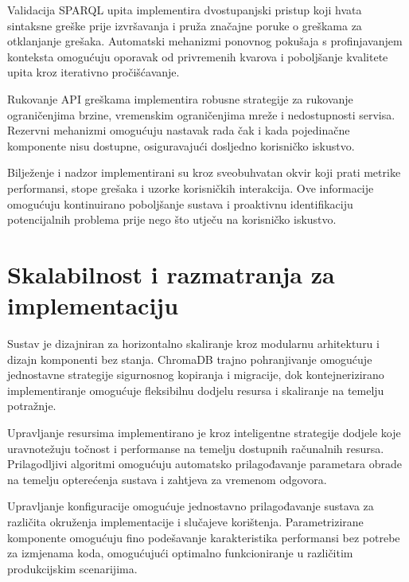 Validacija SPARQL upita implementira dvostupanjski pristup koji hvata sintaksne greške prije izvršavanja i pruža značajne poruke o greškama za otklanjanje grešaka. Automatski mehanizmi ponovnog pokušaja s profinjavanjem konteksta omogućuju oporavak od privremenih kvarova i poboljšanje kvalitete upita kroz iterativno pročišćavanje.

Rukovanje API greškama implementira robusne strategije za rukovanje ograničenjima brzine, vremenskim ograničenjima mreže i nedostupnosti servisa. Rezervni mehanizmi omogućuju nastavak rada čak i kada pojedinačne komponente nisu dostupne, osiguravajući dosljedno korisničko iskustvo.

Bilježenje i nadzor implementirani su kroz sveobuhvatan okvir koji prati metrike performansi, stope grešaka i uzorke korisničkih interakcija. Ove informacije omogućuju kontinuirano poboljšanje sustava i proaktivnu identifikaciju potencijalnih problema prije nego što utječu na korisničko iskustvo.

\section{Skalabilnost i razmatranja za implementaciju}
\label{sec:scalability}

Sustav je dizajniran za horizontalno skaliranje kroz modularnu arhitekturu i dizajn komponenti bez stanja. ChromaDB trajno pohranjivanje omogućuje jednostavne strategije sigurnosnog kopiranja i migracije, dok kontejnerizirano implementiranje omogućuje fleksibilnu dodjelu resursa i skaliranje na temelju potražnje.

Upravljanje resursima implementirano je kroz inteligentne strategije dodjele koje uravnotežuju točnost i performanse na temelju dostupnih računalnih resursa. Prilagodljivi algoritmi omogućuju automatsko prilagođavanje parametara obrade na temelju opterećenja sustava i zahtjeva za vremenom odgovora.

Upravljanje konfiguracije omogućuje jednostavno prilagođavanje sustava za različita okruženja implementacije i slučajeve korištenja. Parametrizirane komponente omogućuju fino podešavanje karakteristika performansi bez potrebe za izmjenama koda, omogućujući optimalno funkcioniranje u različitim produkcijskim scenarijima. 